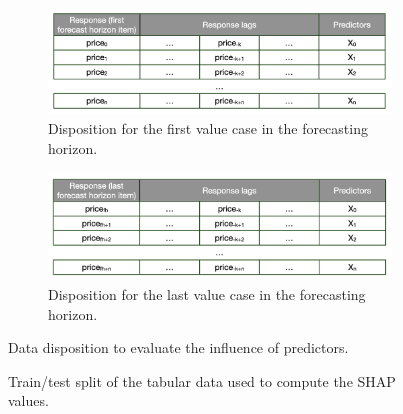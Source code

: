 \begin{figure}[H]
\centering
    \begin{subfigure}{.95\textwidth}
        \centering
        \includegraphics[width=1\linewidth]{images/methodology/shap_arrangement_first}
        \caption{Disposition for the first value case in the forecasting horizon.}
        \label{fig:shap-arrangement-first}
    \end{subfigure}
    \vspace{0.3cm}
    \begin{subfigure}{.95\textwidth}
        \centering
        \includegraphics[width=1\linewidth]{images/methodology/shap_arrangement_last}
        \caption{Disposition for the last value case in the forecasting horizon.}
        \label{fig:shap-arrangement-last}
    \end{subfigure}

    \caption{Data disposition to evaluate the influence of predictors.}
    \label{fig:shap-arrangement}
\end{figure}

\begin{figure}[H]
\centering
    \caption{Train/test split of the tabular data used to compute the SHAP values.}
    \label{fig:shap-train-test}
\end{figure}


